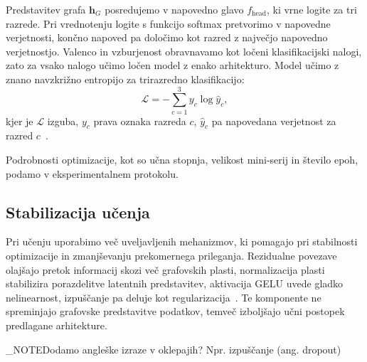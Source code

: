 Predstavitev grafa $\mathbf{h}_G$ posredujemo v napovedno glavo $f_{\text{head}}$, ki vrne logite za tri razrede.
Pri vrednotenju logite s funkcijo softmax pretvorimo v napovedne verjetnosti, končno napoved pa določimo kot razred z največjo napovedno verjetnostjo.
Valenco in vzburjenost obravnavamo kot ločeni klasifikacijski nalogi, zato za vsako nalogo učimo ločen model z enako arhitekturo.
Model učimo z znano navzkrižno entropijo za trirazredno klasifikacijo:
\begin{equation}
    \mathcal{L}
    =
    - \sum_{c=1}^{3}
    y_c \log \hat{y}_c,
\end{equation} 
kjer je $\mathcal{L}$ izguba, $y_c$ prava oznaka razreda $c$, $\hat{y}_c$ pa napovedana verjetnost za razred $c$~\cite{goodfellow2016deep}.

Podrobnosti optimizacije, kot so učna stopnja, velikost mini-serij in število epoh, podamo v eksperimentalnem protokolu.

\subsection{Stabilizacija učenja}
\label{subsec:stabilizacija-ucenja}

Pri učenju uporabimo več uveljavljenih mehanizmov, ki pomagajo pri stabilnosti optimizacije in zmanjševanju prekomernega prileganja.
Rezidualne povezave olajšajo pretok informacij skozi več grafovskih plasti, normalizacija plasti stabilizira porazdelitve latentnih predstavitev, aktivacija GELU uvede gladko nelinearnost, izpuščanje pa deluje kot regularizacija~\cite{he2016deep,ba2016layer,hendrycks2016gelu,srivastava2014dropout}.
Te komponente ne spreminjajo grafovske predstavitve podatkov, temveč izboljšajo učni postopek predlagane arhitekture.

\END_NOTE{Dodamo angleške izraze v oklepajih? Npr. izpuščanje (ang. dropout)}
